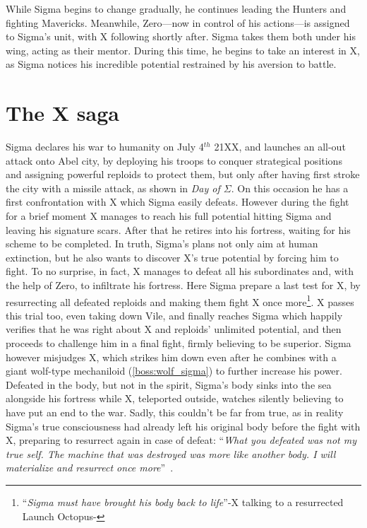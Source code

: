 While Sigma begins to change gradually, he continues leading the Hunters and fighting Mavericks. Meanwhile, Zero—now in control of his actions—is assigned to Sigma’s unit, with X following shortly after. Sigma takes them both under his wing, acting as their mentor. During this time, he begins to take an interest in X, as Sigma notices his incredible potential restrained by his aversion to battle.


\section{The X saga}
Sigma declares his war to humanity on July 4$^{th}$ 21XX, and launches an all-out attack onto Abel city, by deploying his troops to conquer strategical positions and assigning powerful reploids to protect them, but only after having first stroke the city  with a missile attack, as shown in \textit{Day of $\Sigma$}. On this occasion he has a first confrontation with X which Sigma easily defeats. However during the fight for a brief moment X manages to reach his full potential hitting Sigma and leaving his signature scars. After that he retires into his fortress, waiting for his scheme to be completed. In truth, Sigma's plans not only aim at human extinction, but he also wants to discover X's true potential by forcing him to fight. To no surprise, in fact, X manages to defeat all his subordinates and, with the help of Zero, to infiltrate his fortress. Here Sigma prepare a last test for X, by resurrecting all defeated reploids and making them fight X once more\footnote{``\textit{Sigma must have brought his body back to life}''-X talking to a resurrected Launch Octopus-\cite{wiki:MM_MHX_script}}. X passes this trial too, even taking down Vile, and finally reaches Sigma which happily verifies that he was right about X and reploids' unlimited potential, and then proceeds to challenge him in a final fight, firmly believing to be superior. Sigma however misjudges X, which strikes him down even after he combines with a giant wolf-type mechaniloid (\ref{boss:wolf_sigma}) to further increase his power. Defeated in the body, but not in the spirit, Sigma's body sinks into the sea alongside his fortress while X, teleported outside, watches silently believing to have put an end to the war. Sadly, this couldn't be far from true, as in reality Sigma's true consciousness had already left his original body before the fight with X, preparing to resurrect again in case of defeat: ``\textit{What you defeated was not my true self. The machine that was destroyed was more like another body. I will materialize and resurrect once more}''~\cite{wordpress:X_japanese_script}.

